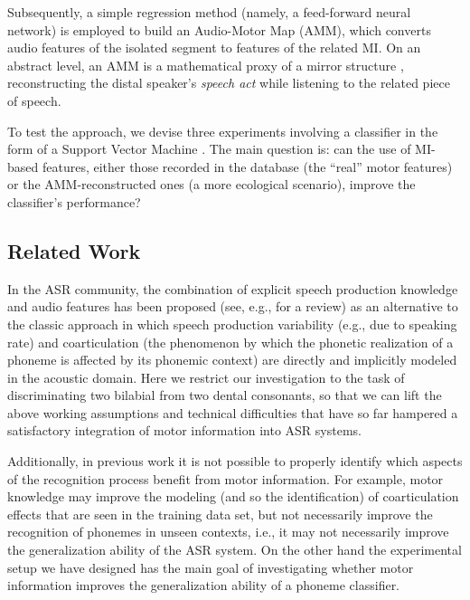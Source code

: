 Subsequently, a simple regression method (namely, a feed-forward neural network) is employed
to build an Audio-Motor Map (AMM), which converts audio features of the isolated segment to
features of the related MI. On an abstract level, an AMM is a mathematical proxy of a mirror
structure \cite{umilta-01}, reconstructing the distal speaker's \emph{speech act} while
listening to the related piece of speech.

To test the approach, we devise three experiments involving a classifier in the form of a
Support Vector Machine \cite{BGV92}. The main question is: can the use of MI-based features,
either those recorded in the database (the ``real'' motor features) or the AMM-reconstructed
ones (a more ecological scenario), improve the classifier's performance?

\subsection{Related Work}

In the ASR community, the combination of explicit speech production knowledge and audio
features has been proposed (see, e.g., \cite{king} for a review) as an alternative to the
classic approach in which speech production variability (e.g., due to speaking rate) and
coarticulation (the phenomenon by which the phonetic realization of a phoneme is affected
by its phonemic context) are directly and implicitly modeled in the acoustic domain.
Here we restrict our investigation to the task of discriminating two bilabial from two
dental consonants, so that we can lift the above working assumptions and technical
difficulties that have so far hampered a satisfactory integration of motor information
into ASR systems.

Additionally, in previous work it is not possible to properly identify which aspects of the
recognition process benefit from motor information. For example, motor knowledge may improve
the modeling (and so the identification) of coarticulation effects that are seen in the training
data set, but not necessarily improve the recognition of phonemes in unseen contexts, i.e., it
may not necessarily improve the generalization ability of the ASR system. On the other hand the
experimental setup we have designed has the main goal of investigating whether motor information
improves the generalization ability of a phoneme classifier.


